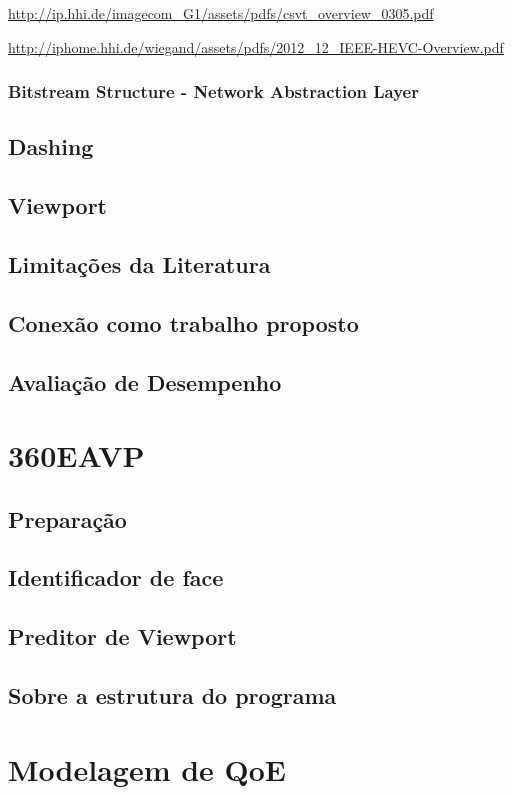 \url{http://ip.hhi.de/imagecom_G1/assets/pdfs/csvt_overview_0305.pdf }

\url{http://iphome.hhi.de/wiegand/assets/pdfs/2012_12_IEEE-HEVC-Overview.pdf}

\subsubsection{Bitstream Structure - Network Abstraction Layer}
\subsection{Dashing}
\subsection{Viewport}
\subsection{Limitações da Literatura}
\subsection{Conexão como trabalho proposto}
\subsection{Avaliação de Desempenho}


\section{360EAVP}
\subsection{Preparação}
\subsection{Identificador de face}
\subsection{Preditor de Viewport}
\subsection{Sobre a estrutura do programa}

\section{Modelagem de QoE}
